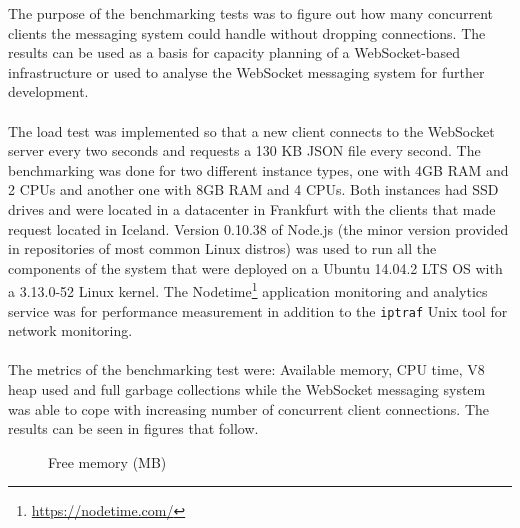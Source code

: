 The purpose of the benchmarking tests was to figure out how many concurrent clients the messaging system could handle without dropping connections. The results can be used as a basis for capacity planning of a WebSocket-based infrastructure or used to analyse the WebSocket messaging system for further development.
\\ \\
The load test was implemented so that a new client connects to the WebSocket server every two seconds and requests a 130 KB JSON file every second. The benchmarking was done for two different instance types, one with 4GB RAM  and 2 CPUs and another one with 8GB RAM and 4 CPUs. Both instances had SSD drives and were located in a datacenter in Frankfurt with the clients that made request located in Iceland. Version 0.10.38 of Node.js (the minor version provided in repositories of most common Linux distros) was used to run all the components of the system that were deployed on a Ubuntu 14.04.2 LTS OS with a 3.13.0-52 Linux kernel. The Nodetime\footnote{\url{https://nodetime.com/}} application monitoring and analytics service was for performance measurement in addition to the \texttt{iptraf} Unix tool for network monitoring.
\\ \\
The metrics of the benchmarking test were: Available memory, CPU time, V8 heap used and full garbage collections while the WebSocket messaging system was able to cope with increasing number of concurrent client connections. The results can be seen in figures that follow.

\begin{figure}[h!]
	\centering
	 \hfill
	\caption{Free memory (MB)}
\end{figure}


